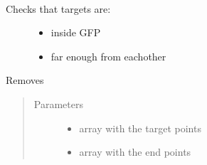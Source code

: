 \documentclass[letterpaper,10pt,english]{sphinxmanual}
\begin{document}
\begin{fulllineitems}
\label{\detokenize{reference:taipanPyRouter.checkValidGFPandCrash}}~\begin{description}
\item[{Checks that targets are:}] \leavevmode\begin{itemize}
\item {} 
inside GFP

\item {} 
far enough from eachother

\end{itemize}

\end{description}

Removes
\begin{quote}\begin{description}
\item[{Parameters}] \leavevmode\begin{itemize}
\item {} 
 \textendash{} array with the target points

\item {} 
 \textendash{} array with the end points

\end{itemize}

\end{description}\end{quote}

\end{fulllineitems}

\end{document}
